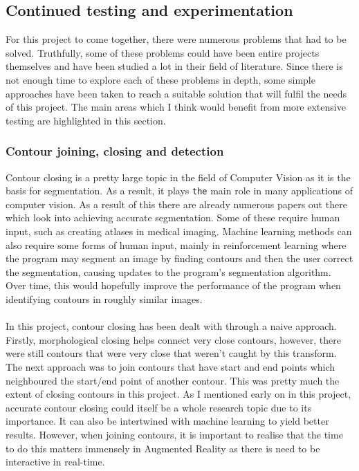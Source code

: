 \documentclass[11pt]{article}
\begin{document}
\subsection{Continued testing and experimentation} 
For this project to come together, there were numerous problems that
had to be solved. Truthfully, some of these problems could have been entire
projects themselves and have been studied a lot in their field of literature.
Since there is not enough time to explore each of these problems in 
depth, some simple approaches have been taken to reach a suitable solution
that will fulfil the needs of this project. The main areas which I think would
benefit from more extensive testing are highlighted in this section.

\subsubsection{Contour joining, closing and detection}
Contour closing is a pretty large topic in the field of Computer Vision as 
it is the basis for segmentation. As a result, it plays \texttt{the} main role
in many applications of computer vision. As a result of this there are 
already numerous papers out there which look into achieving accurate segmentation.
Some of these require human input, such as creating atlases in medical imaging.
Machine learning methods can also require some forms of human input, mainly in 
reinforcement learning where the program may segment an image by finding contours 
and then the user correct the segmentation, causing updates to the program's
segmentation algorithm. Over time, this would hopefully improve the performance
of the program when identifying contours in roughly similar images. \\
\\
In this project, contour closing has been dealt with through 
a naive approach. Firstly, morphological closing helps connect 
very close contours, however, there were still contours that were 
very close that weren't caught by this transform. The next approach 
was to join contours that have start and end points which
neighboured the start/end point of another contour. This was pretty much
the extent of closing contours in this project. As I mentioned early on
in this project, accurate contour closing could itself be a whole
research topic due to its importance. It can also be intertwined with 
machine learning to yield better results. However, when joining contours,
it is important to realise that the time to do this matters immensely in 
Augmented Reality as there is need to be interactive in real-time.\\
\end{document}
